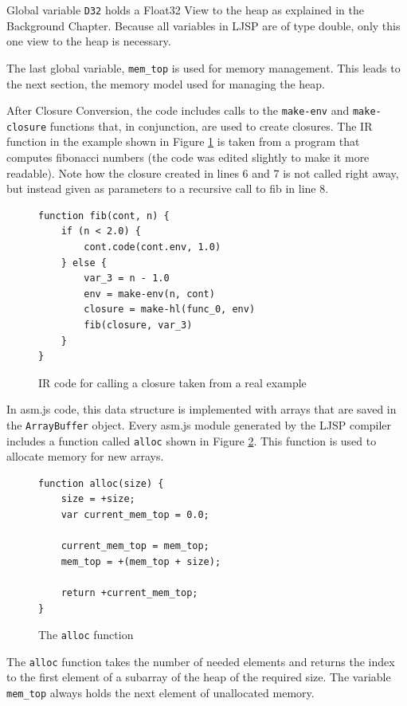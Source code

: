 \documentclass[11pt]{report}
\begin{document}
Global variable \texttt{D32} holds a Float32 View to the heap as explained in the Background Chapter. Because all variables in LJSP are of type double, only this one view to the heap is necessary.

The last global variable, \texttt{mem_top} is used for memory management. This leads to the next section, the memory model used for managing the heap.

After Closure Conversion, the code includes calls to the \texttt{make-env} and \texttt{make-closure} functions that, in conjunction, are used to create closures.  The IR function in the example shown in Figure \ref{iasmjsmm2} is taken from a program that computes fibonacci numbers (the code was edited slightly to make it more readable). Note how the closure created in lines 6 and 7 is not called right away, but instead given as parameters to a recursive call to fib in line 8.

\begin{figure}[ht]
\begin{lstlisting}
function fib(cont, n) {
    if (n < 2.0) {
        cont.code(cont.env, 1.0)
    } else {
        var_3 = n - 1.0
        env = make-env(n, cont)
        closure = make-hl(func_0, env)
        fib(closure, var_3)
    }
}
\end{lstlisting}
\caption{IR code for calling a closure taken from a real example}
\label{iasmjsmm2}
\end{figure}

In asm.js code, this data structure is implemented with arrays that are saved in the \texttt{ArrayBuffer} object. Every asm.js module generated by the LJSP compiler includes a function called \texttt{alloc} shown in Figure \ref{iasmjsmm3}. This function is used to allocate memory for new arrays.

\begin{figure}[ht]
\begin{lstlisting}
function alloc(size) {
    size = +size;
    var current_mem_top = 0.0;

    current_mem_top = mem_top;
    mem_top = +(mem_top + size);

    return +current_mem_top;
}
\end{lstlisting}
\caption{The \texttt{alloc} function}
\label{iasmjsmm3}
\end{figure}

The \texttt{alloc} function takes the number of needed elements and returns the index to the first element of a subarray of the heap of the required size. The variable \texttt{mem_top} always holds the next element of unallocated memory.
\end{document}
